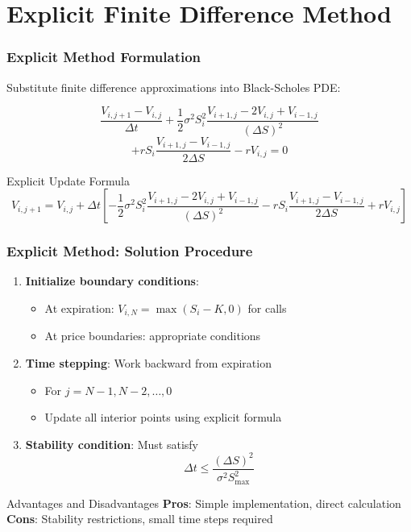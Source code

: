 \documentclass{beamer}
\begin{document}
\section{Explicit Finite Difference Method}

\begin{frame}
\frametitle{Explicit Method Formulation}
Substitute finite difference approximations into Black-Scholes PDE:

\[\frac{V_{i,j+1} - V_{i,j}}{\Delta t} + \frac{1}{2}\sigma^2 S_i^2 \frac{V_{i+1,j} - 2V_{i,j} + V_{i-1,j}}{(\Delta S)^2}\]
\[+ rS_i \frac{V_{i+1,j} - V_{i-1,j}}{2\Delta S} - rV_{i,j} = 0\]

\begin{block}{Explicit Update Formula}
\[V_{i,j+1} = V_{i,j} + \Delta t \left[ -\frac{1}{2}\sigma^2 S_i^2 \frac{V_{i+1,j} - 2V_{i,j} + V_{i-1,j}}{(\Delta S)^2} - rS_i \frac{V_{i+1,j} - V_{i-1,j}}{2\Delta S} + rV_{i,j} \right]\]
\end{block}
\end{frame}

\begin{frame}
\frametitle{Explicit Method: Solution Procedure}
\begin{enumerate}
\item \textbf{Initialize boundary conditions}:
   \begin{itemize}
   \item At expiration: \(V_{i,N} = \max(S_i - K, 0)\) for calls
   \item At price boundaries: appropriate conditions
   \end{itemize}

\item \textbf{Time stepping}: Work backward from expiration
   \begin{itemize}
   \item For \(j = N-1, N-2, \ldots, 0\)
   \item Update all interior points using explicit formula
   \end{itemize}

\item \textbf{Stability condition}: Must satisfy
   \[\Delta t \leq \frac{(\Delta S)^2}{\sigma^2 S_{\max}^2}\]
\end{enumerate}

\begin{block}{Advantages and Disadvantages}
\textbf{Pros}: Simple implementation, direct calculation\\
\textbf{Cons}: Stability restrictions, small time steps required
\end{block}
\end{frame}
\end{document}
